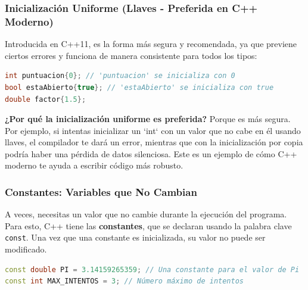 \subsubsection{Inicialización Uniforme (Llaves - Preferida en C++ Moderno)}
Introducida en C++11, es la forma más segura y recomendada, ya que previene ciertos errores y funciona de manera consistente para todos los tipos:
\begin{lstlisting}[language=C++]
int puntuacion{0}; // 'puntuacion' se inicializa con 0
bool estaAbierto{true}; // 'estaAbierto' se inicializa con true
double factor{1.5};
\end{lstlisting}

\textbf{¿Por qué la inicialización uniforme es preferida?}
Porque es más segura. Por ejemplo, si intentas inicializar un `int` con un valor que no cabe en él usando llaves, el compilador te dará un error, mientras que con la inicialización por copia podría haber una pérdida de datos silenciosa. Este es un ejemplo de cómo C++ moderno te ayuda a escribir código más robusto.

\subsubsection{Constantes: Variables que No Cambian}

A veces, necesitas un valor que no cambie durante la ejecución del programa. Para esto, C++ tiene las \textbf{constantes}, que se declaran usando la palabra clave \texttt{const}. Una vez que una constante es inicializada, su valor no puede ser modificado.

\begin{lstlisting}[language=C++]
const double PI = 3.14159265359; // Una constante para el valor de Pi
const int MAX_INTENTOS = 3; // Número máximo de intentos
\end{lstlisting}


